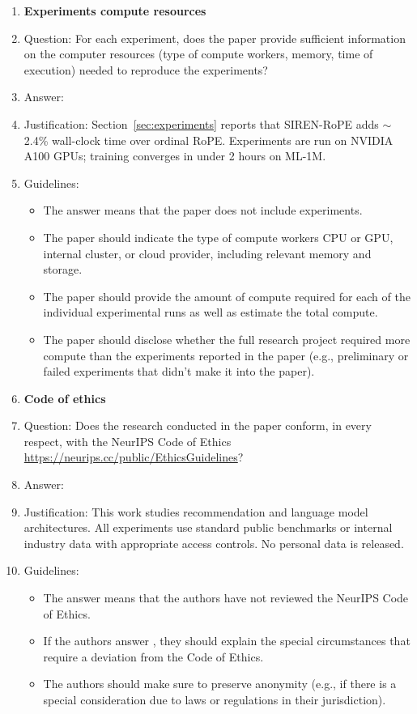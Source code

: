 \begin{enumerate}
\item {\bf Experiments compute resources}
    \item[] Question: For each experiment, does the paper provide sufficient information on the computer resources (type of compute workers, memory, time of execution) needed to reproduce the experiments?
    \item[] Answer: \answerYes{}
    \item[] Justification: Section~\ref{sec:experiments} reports that SIREN-RoPE adds $\sim$2.4\% wall-clock time over ordinal RoPE. Experiments are run on NVIDIA A100 GPUs; training converges in under 2 hours on ML-1M.
    \item[] Guidelines:
    \begin{itemize}
        \item The answer \answerNA{} means that the paper does not include experiments.
        \item The paper should indicate the type of compute workers CPU or GPU, internal cluster, or cloud provider, including relevant memory and storage.
        \item The paper should provide the amount of compute required for each of the individual experimental runs as well as estimate the total compute.
        \item The paper should disclose whether the full research project required more compute than the experiments reported in the paper (e.g., preliminary or failed experiments that didn't make it into the paper).
    \end{itemize}

\item {\bf Code of ethics}
    \item[] Question: Does the research conducted in the paper conform, in every respect, with the NeurIPS Code of Ethics \url{https://neurips.cc/public/EthicsGuidelines}?
    \item[] Answer: \answerYes{}
    \item[] Justification: This work studies recommendation and language model architectures. All experiments use standard public benchmarks or internal industry data with appropriate access controls. No personal data is released.
    \item[] Guidelines:
    \begin{itemize}
        \item The answer \answerNA{} means that the authors have not reviewed the NeurIPS Code of Ethics.
        \item If the authors answer \answerNo{}, they should explain the special circumstances that require a deviation from the Code of Ethics.
        \item The authors should make sure to preserve anonymity (e.g., if there is a special consideration due to laws or regulations in their jurisdiction).
    \end{itemize}


\end{enumerate}
